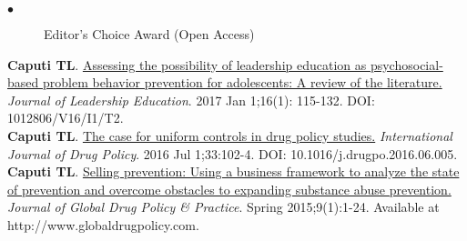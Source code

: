 \documentclass[11pt, letterpaper]{article}
\newcommand{\years}[1]{\marginnote{\normalsize #1}}
\begin{document}
    \begin{description}
    \item[$\bullet$] Editor's Choice Award (Open Access)
    \end{description}
\years{2017}\textbf{Caputi TL}. \href{http://journalofleadershiped.org/attachments/article/479/0571_caputi.pdf}{Assessing the possibility of leadership education as psychosocial-based problem behavior prevention for adolescents: A review of the literature.} \textit{Journal of Leadership Education}. 2017 Jan 1;16(1): 115-132. DOI: 1012806/V16/I1/T2.\\[.2cm]
\years{2016}\textbf{Caputi TL}. \href{http://dx.doi.org/10.1016/j.drugpo.2016.06.005}{The case for uniform controls in drug policy studies.}  \textit{International Journal of Drug Policy}. 2016 Jul 1;33:102-4. DOI: 10.1016/j.drugpo.2016.06.005.\\[.2cm]
\years{2015}\textbf{Caputi TL}. \href{http://www.globaldrugpolicy.com}{Selling prevention: Using a business framework to analyze the state of prevention and overcome obstacles to expanding substance abuse prevention.} \textit{Journal of Global Drug Policy \& Practice}. Spring 2015;9(1):1-24. Available at http://www.globaldrugpolicy.com. \\[.2cm]
\end{document}
